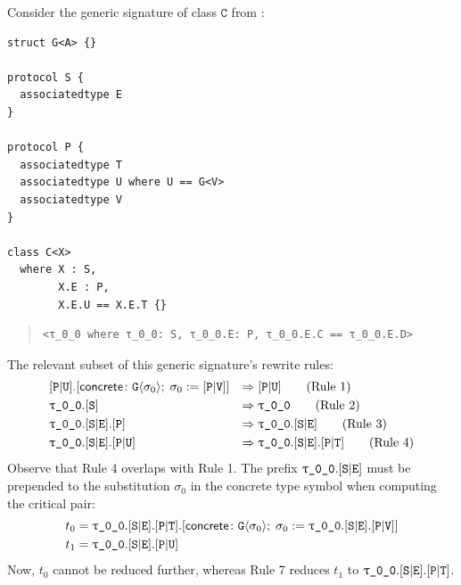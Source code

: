 \documentclass[../generics]{subfiles}
\begin{document}
\begin{example}
Consider the generic signature of class $\texttt{C}$ from :
\begin{listing}\label{overlapconcreteex}
\begin{Verbatim}
struct G<A> {}

protocol S {
  associatedtype E
}

protocol P {
  associatedtype T
  associatedtype U where U == G<V>
  associatedtype V
}

class C<X>
  where X : S,
        X.E : P,
        X.E.U == X.E.T {}
\end{Verbatim}
\end{listing}
\begin{quote}
\begin{verbatim}
<τ_0_0 where τ_0_0: S, τ_0_0.E: P, τ_0_0.E.C == τ_0_0.E.D>
\end{verbatim}
\end{quote}
The relevant subset of this generic signature's rewrite rules:
\begin{align}
&\assocsym{P}{U}.\concretesym{\texttt{G}\langle\sigma_0\rangle;\;\sigma_0:=\assocsym{P}{V}}&\Rightarrow\;&\assocsym{P}{U}\tag{Rule 1}\\
&\rT.\protosym{S}&\Rightarrow\;&\rT\tag{Rule 2}\\
&\rT.\assocsym{S}{E}.\pP&\Rightarrow\;&\rT.\assocsym{S}{E}\tag{Rule 3}\\
&\rT.\assocsym{S}{E}.\assocsym{P}{U}&\Rightarrow\;&\rT.\assocsym{S}{E}.\assocsym{P}{T}\tag{Rule 4}
\end{align}
Observe that Rule 4 overlaps with Rule 1. The prefix $\rT.\assocsym{S}{E}$ must be prepended to the substitution $\sigma_0$ in the concrete type symbol when computing the critical pair:
\begin{align*}
t_0&=\rT.\assocsym{S}{E}.\assocsym{P}{T}.\concretesym{\texttt{G}\langle\sigma_0\rangle;\;\sigma_0:=\rT.\assocsym{S}{E}.\assocsym{P}{V}}\\
t_1&=\rT.\assocsym{S}{E}.\assocsym{P}{U}
\end{align*}
Now, $t_0$ cannot be reduced further, whereas Rule 7 reduces $t_1$ to
$\rT.\assocsym{S}{E}.\assocsym{P}{T}$.

\end{example}
\end{document}

